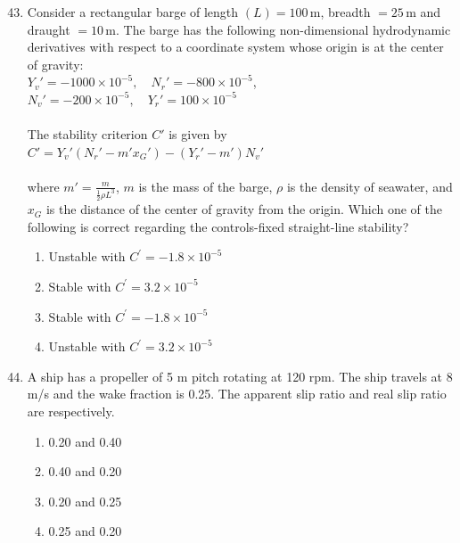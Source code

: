 \documentclass[journal]{IEEEtran}
\theoremstyle{remark}
\begin{document}
\begin{enumerate}[itemsep=1em]
\setcounter{enumi}{42}
\item Consider a rectangular barge of length $(L) = 100 \,\text{m}$, breadth $= 25 \,\text{m}$ and draught $= 10 \,\text{m}$.  
The barge has the following non-dimensional hydrodynamic derivatives with respect to a coordinate system whose origin is at the center of gravity:  
\\
$Y_{v}' = -1000 \times 10^{-5}, \quad N_{r}' = -800 \times 10^{-5}$,\\ 

$N_{v}' = -200 \times 10^{-5}, \quad Y_{r}' = 100 \times 10^{-5}$\\
\\
The stability criterion $C'$ is given by  \\

$C' = Y_{v}' \left( N_{r}' - m' x_{G}' \right) - \left( Y_{r}' - m' \right) N_{v}'$\\
\\
where $m' = \frac{m}{\tfrac{1}{2}\rho L^{3}}$, $m$ is the mass of the barge, $\rho$ is the density of seawater, and $x_{G}$ is the distance of the center of gravity from the origin. Which one of the following is correct regarding the controls-fixed straight-line stability?
\newpage
\vspace*{0.25cm}
\begin{enumerate}[leftmargin=2.5em, labelsep=0.5em, itemsep=0.5em]
    \item Unstable with $C^{'}=-1.8\times10^{-5}$
    \item Stable with $C^{'}=3.2\times10^{-5}$
    \item Stable with $C^{'}=-1.8\times10^{-5}$
    \item Unstable with $C^{'}=3.2\times10^{-5}$
\end{enumerate}
\end{enumerate}

\begin{enumerate}[itemsep=1em]
\setcounter{enumi}{43}
\item A ship has a propeller of 5 m pitch rotating at 120 rpm. The ship travels at 8 m/s and the wake fraction is 0.25. The apparent slip ratio and real slip ratio are \underline{\hspace{1cm}} respectively. 
\begin{multicols}{4}
\begin{enumerate}
    \item 0.20 and 0.40 
    \item 0.40 and 0.20 
    \item 0.20 and 0.25 
    \item 0.25 and 0.20 
\end{enumerate}
\end{multicols}
\end{enumerate}
\end{document}
